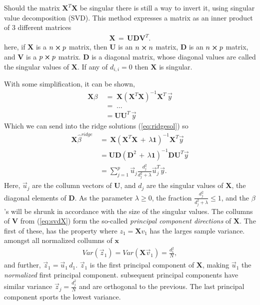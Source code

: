 \documentclass[ 12pt, a4paper ]{article}
\begin{document}
Should the matrix $\mathbf{X}^T \mathbf{X}$ be singular there is still a way to invert it, 
using singular value decomposition (SVD). This method expresses a matrix as an inner product 
of 3 different matrices%
\begin{align}
    \mathbf{X} \,=\, \mathbf{U}\mathbf{D}\mathbf{V}^T.\label{eq:svdX}
\end{align}
here, if $\mathbf{X}$ is a $n\cross p$ matrix, then $\mathbf{U}$ is an $n \cross n$ matrix, 
$\mathbf{D}$ is an $n\cross p$ matrix, and $\mathbf{V}$ is a $p\cross p$ matrix. $\mathbf{D}$
is a diagonal matrix, whose diagonal values are called the singular values of $\mathbf{X}$.
If any of $d_{i,i}=0$ then $\mathbf{X}$ is singular. 

With some simplification, it can be shown,
\begin{align}
    \mathbf{X}\beta  \;&=\; \mathbf{X}(\mathbf{X}^T\mathbf{X})^{-1}\mathbf{X}^T\, \vec{y}
    \nonumber \\
                       &= \;\ldots\nonumber \\
                       &= \mathbf{U}\mathbf{U}^T \, \vec{y}
\end{align}
Which we can send into the ridge solutions (\ref{eq:ridgesol}) so
\begin{align}
    \mathbf{X}\hat{\beta}^{ridge} \,&=\, 
    \mathbf{X}(\mathbf{X}^T\mathbf{X} \,+\,\lambda \mathbf{1})^{-1}\mathbf{X}^T \vec{y}
    \nonumber \\
    &= \mathbf{U}\mathbf{D}(\mathbf{D}^2 
    \,+\,\lambda \mathbf{1})^{-1}\mathbf{D}\mathbf{U}^T \vec{y}
    \nonumber \\
    &= \sum_{j=1}^p \vec{u}_j \frac{d_j^2}{d_j^2 + \lambda} \vec{u}_j^T \vec{y}.
\end{align}
Here, $\vec{u}_j$ are the collumn vectors of $\mathbf{U}$, and $d_j$ are the singular values 
of $\mathbf{X}$, the diagonal elements of $\mathbf{D}$. As the parameter $\lambda \geq 0$, the
fraction $\frac{d_j^2}{d_j^2 + \lambda} \leq 1$, and the $\beta$'s will be shrunk in accordance
with the size of the singular values. The collumns of $\mathbf{V}$ from (\ref{eq:svdX}) form the
so-called \textit{principal component directions} of $\mathbf{X}$. The first of these, has the 
property where $z_1 = \mathbf{X}v_1$ has the larges sample variance. amongst all normalized
collumns of $\mathbf{x}$
\begin{align}
    Var(\vec{z}_1) = Var(\mathbf{X}\vec{v}_1) = \frac{d_1^2}{N},
\end{align}
and further, $\vec{z}_1 = \vec{u}_1\,d_1$. $\vec{z}_1$ is the first principal component of 
$\mathbf{X}$, making $\vec{u}_1$ the \textit{normalized} first principal component. subsequent 
principal components have similar variance $\vec{z}_j = \frac{d_j^2}{N}$ and are orthogonal to
the previous. The last principal component sports the lowest variance.
\end{document}
